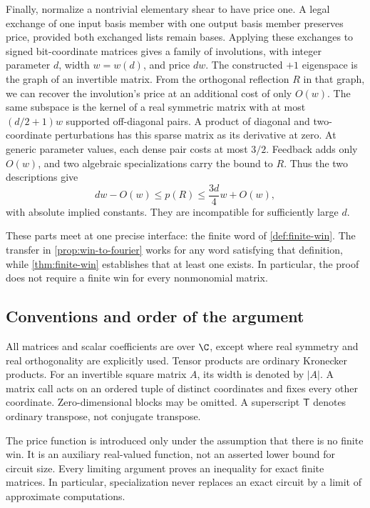 \begin{enumerate}[leftmargin=*,label=\textup{(\roman*)}]
Finally, normalize a nontrivial elementary shear to have price one.
A legal exchange of one input basis member with one output basis member
preserves price, provided both exchanged lists remain bases. Applying
these exchanges to signed bit-coordinate matrices gives a family of
involutions, with integer parameter $d$, width $w=w(d)$, and price $dw$.
The constructed $+1$ eigenspace is the graph of an invertible matrix.
From the orthogonal reflection $R$ in that graph, we can recover the
involution's price at an additional cost of only $O(w)$.
The same subspace is the kernel of a real symmetric matrix with at most
$(d/2+1)w$ supported off-diagonal pairs. A product of diagonal and
two-coordinate perturbations has this sparse matrix as its derivative
at zero. At generic parameter values, each dense pair costs at most
$3/2$. Feedback adds only $O(w)$, and two algebraic specializations
carry the bound to $R$. Thus the two descriptions give
\[
 dw-O(w)\leq p(R)\leq \frac{3d}{4}w+O(w),
\]
with absolute implied constants. They are incompatible for sufficiently
large $d$.
\end{enumerate}

These parts meet at one precise interface: the finite word of
\cref{def:finite-win}. The transfer in \cref{prop:win-to-fourier} works
for any word satisfying that definition, while
\cref{thm:finite-win} establishes that at least one exists. In particular,
the proof does not require a finite win for every nonmonomial matrix.

\subsection{Conventions and order of the argument}

All matrices and scalar coefficients are over $\C$, except where real
symmetry and real orthogonality are explicitly used. Tensor products are
ordinary Kronecker products. For an invertible square
matrix $A$, its width is denoted by $|A|$. A matrix call acts on an ordered
tuple of distinct coordinates and fixes every other coordinate.
Zero-dimensional blocks may be omitted. A superscript $\mathsf T$
denotes ordinary transpose, not conjugate transpose.

The price function is introduced only under the assumption that there
is no finite win. It is an auxiliary real-valued function, not an
asserted lower bound for circuit size. Every limiting argument proves
an inequality for exact finite matrices. In particular, specialization
never replaces an exact circuit by a limit of approximate computations.

